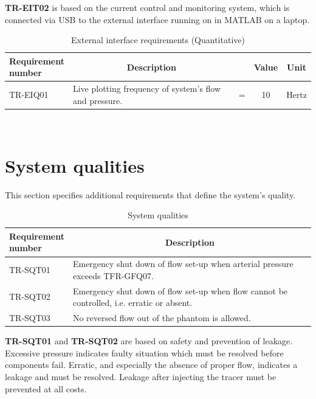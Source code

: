 \textbf{TR-EIT02} is based on the current control and monitoring system, which is connected via USB to the external interface running on in MATLAB on a laptop.

\begin{table}[H]
\caption{External interface requirements (Quantitative)}
\label{tab:extint_quan}
\begin{tabular}{l|p{65mm}ccp{20mm}|}
	\makecell[l]{\textbf{Requirement} \\  \textbf{number}} & \multicolumn{1}{c}{\textbf{Description}} & \multicolumn{1}{c}{ } & \multicolumn{1}{c}{\textbf{Value}} & \multicolumn{1}{c}{\textbf{Unit}} \\
	\hline	
	TR-EIQ01 &  Live plotting frequency of system's flow and pressure. & = &  10 & Hertz \\
	\cline{2-5}
\end{tabular} \\
\end{table}

\section{System qualities}
This section specifies additional requirements that define the system's quality.
\begin{table} [H]
\caption{System qualities}
\label{tab:sysqual}
\begin{tabular}{l|p{120mm}|}
	\makecell[l]{\textbf{Requirement} \\ \textbf{number}} & \multicolumn{1}{c}{\textbf{Description}}\\
	\hline
	TR-SQT01 & Emergency shut down of flow set-up when arterial pressure exceeds TFR-GFQ07. \\ 
	TR-SQT02 & Emergency shut down of flow set-up when flow cannot be controlled, i.e. erratic or absent. \\
	TR-SQT03 & No reversed flow out of the phantom is allowed. \\
	\cline{2-2}
\end{tabular}
\end{table}

\textbf{TR-SQT01} and \textbf{TR-SQT02} are based on safety and prevention of leakage. Excessive pressure indicates faulty situation which must be resolved before components fail. Erratic, and especially the absence of proper flow, indicates a leakage and must be resolved. Leakage after injecting the tracer must be prevented at all costs.

